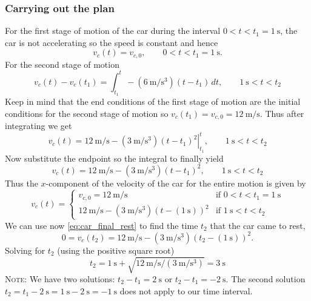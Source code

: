 \documentclass[solutions]{esg8012exam}
\begin{document}
  \subsubsection{Carrying out the plan}
    For the first stage of motion of the car during the interval $0 < t < t_1 = \SI{1}{\second}$, the car is not accelerating so the speed is constant and hence
    $$v_c(t) = v_{c,0},\qquad 0 < t < t_1 = \SI{1}{\second}.$$
    For the second stage of motion
    $$v_c(t) - v_c(t_1) = \int_{t_1}^t -(\SI{6}{\meter\per\second\cubed})(t - t_1)\,dt,\qquad \SI{1}{\second} < t < t_2$$
    Keep in mind that the end conditions of the first stage of motion are the initial conditions for the second stage of motion so $v_c(t_1) = v_{c,0} = \SI{12}{\meter\per\second}$. Thus after integrating we get
    $$v_c(t) = \SI{12}{\meter\per\second} - \left.(\SI{3}{\meter\per\second\cubed})(t - t_1)^2\right|_{t_1}^t,\qquad \SI{1}{\second} < t < t_2$$
    Now substitute the endpoint so the integral to finally yield
    \begin{equation}
      v_c(t) = \SI{12}{\meter\per\second} - (\SI{3}{\meter\per\second\cubed})(t - t_1)^2,\qquad \SI{1}{\second} < t < t_2 \label{eq:car_second_velocity}
    \end{equation}
    Thus the $x$-component of the velocity of the car for the entire motion is given by
    \begin{equation}
      v_c(t) = \begin{cases}
                v_{c,0} = \SI{12}{\meter\per\second} & \text{if }0 < t < t_1 = \SI{1}{\second} \\
                \SI{12}{\meter\per\second} - (\SI{3}{\meter\per\second\cubed})\left(t - (\SI{1}{\second})\right)^2 & \text{if }\SI{1}{\second} < t < t_2
               \end{cases}
    \end{equation}
    We can use now \autoref{eq:car_final_rest} to find the time $t_2$ that the car came to rest,
    $$0 = v_c(t_2) = \SI{12}{\meter\per\second} - (\SI{3}{\meter\per\second\cubed})\left(t_2 - (\SI{1}{\second})\right)^2.$$
    Solving for $t_2$ (using the positive square root)
    \begin{equation}
      t_2 = \SI{1}{\second} + \sqrt{\SI{12}{\meter\per\second} / (\SI{3}{\meter\per\second\cubed})} = \SI{3}{\second}
    \end{equation}
    \textsc{Note}: We have two solutions: $t_2 - t_1 = \SI{2}{\second}$ or $t_2 - t_1 = -\SI{2}{\second}$.  The second solution $t_2 = t_1 - \SI{2}{\second} = \SI{1}{\second} - \SI{2}{\second} = -\SI{1}{\second}$ does not apply to our time interval.
\end{document}
